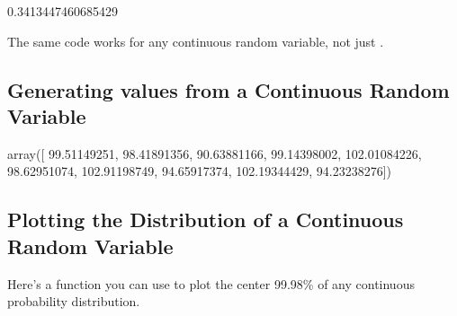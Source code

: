 \documentclass[letterpaper,10pt,english]{sphinxmanual}
\begin{document}
\begin{sphinxVerbatim}[commandchars=\\\{\}]
0.3413447460685429
\end{sphinxVerbatim}

The same code works for any continuous random variable, not just .


\subsection{Generating values from a Continuous Random Variable}
\label{\detokenize{GB213-review-in-Python:generating-values-from-a-continuous-random-variable}}
\begin{sphinxVerbatim}[commandchars=\\\{\}]
    
\end{sphinxVerbatim}

\begin{sphinxVerbatim}[commandchars=\\\{\}]
array([ 99.51149251,  98.41891356,  90.63881166,  99.14398002,
       102.01084226,  98.62951074, 102.91198749,  94.65917374,
       102.19344429,  94.23238276])
\end{sphinxVerbatim}


\subsection{Plotting the Distribution of a Continuous Random Variable}
\label{\detokenize{GB213-review-in-Python:plotting-the-distribution-of-a-continuous-random-variable}}
Here’s a function you can use to plot the center 99.98\% of any continuous probability distribution.

\begin{sphinxVerbatim}[commandchars=\\\{\}]
    
            
          
        
       
\end{sphinxVerbatim}
\end{document}
